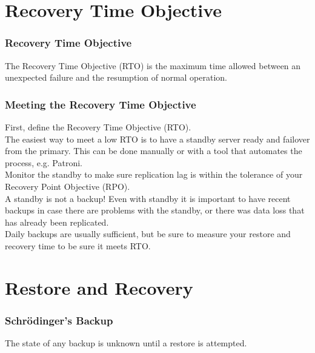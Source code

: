 \section{Recovery Time Objective}

\begin{frame}[fragile]
    \frametitle{Recovery Time Objective}

    \Large The Recovery Time Objective (RTO) is the maximum time allowed between an unexpected failure and the resumption of normal operation.
\end{frame}

\begin{frame}[fragile]
    \frametitle{Meeting the Recovery Time Objective}

    First, define the Recovery Time Objective (RTO).
    \\\vspace{1em}
    The easiest way to meet a low RTO is to have a standby server ready and failover from the primary. This can be done manually or with a tool that automates the process, e.g. Patroni.
    \\\vspace{1em}
    Monitor the standby to make sure replication lag is within the tolerance of your Recovery Point Objective (RPO).
    \\\vspace{1em}
    A standby is not a backup! Even with standby it is important to have recent backups in case there are problems with the standby, or there was data loss that has already been replicated.
    \\\vspace{1em}
    Daily backups are usually sufficient, but be sure to measure your restore and recovery time to be sure it meets RTO.
\end{frame}

\section{Restore and Recovery}

\begin{frame}
    \frametitle{Schr\"{o}dinger’s Backup}

    \Large The state of any backup is unknown until a restore is attempted.
\end{frame}

